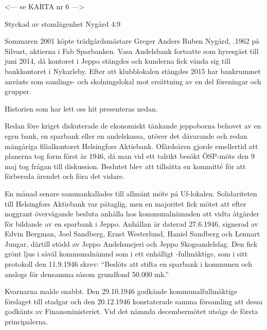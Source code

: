 
<--- se KARTA nr 6 --->


%

Styckad av stomlägenhet Nygård 4:9

%
Sommaren 2001 köpte trädgårdsmästare Greger Anders Ruben	Nygård, .1962 på Silvast, aktierna i Fab Sparbanken. Vasa 	Andelsbank fortsatte som hyresgäst till juni 2014, då kontoret i Jeppo stängdes och kunderna fick vända sig till bankkontoret i Nykarleby. Efter att klubblokalen stängdes 2015 har bankrummet använts som samlings- och skolningslokal mot ersättning av en del föreningar och grupper.

Historien som har lett oss hit presenteras nedan.


%


Redan före kriget diskuterade de ekonomiskt tänkande jeppoborna behovet av en egen bank, en sparbank eller en andelskassa, utöver det dåvarande och redan mångåriga filialkontoret Helsingfors Aktiebank. Ofärdsåren gjorde emellertid att planerna tog form först år 1946, då man vid ett talrikt besökt ÖSP-möte den 9 maj tog frågan till diskussion. Beslutet blev att tillsätta en kommitté för att förbereda ärendet och föra det vidare.

En månad senare sammankallades till allmänt möte på Uf-lokalen. Solidariteten till Helsingfors Aktiebank var påtaglig, men en majoritet fick mötet att efter noggrant övervägande besluta anhålla hos kommunalnämnden att vidta åtgärder för bildande av en sparbank i Jeppo. Anhållan är daterad 27.6.1946, signerad av Edvin Bergman, Joel Sandberg, Ernst Westerlund, Haniel Sandberg och Lennart Jungar, därtill stödd av Jeppo Andelsmejeri och Jeppo Skogsandelslag. Den fick grönt ljus i såväl kommunalnämnd som i ett enhälligt -fullmäktige, som i sitt protokoll den 11.9.1946 skrev: ``Beslöts att stifta en sparbank i kommunen och anslogs för densamma såsom grundfond 50.000 mk.''

Kvarnarna malde snabbt. Den 29.10.1946 godkände kommunalfullmäktige förslaget till stadgar och den 20.12.1946 konstaterade samma församling att dessa godkänts av Finansministeriet. Vid det nämnda decembermötet utsågs de första principalerna.


